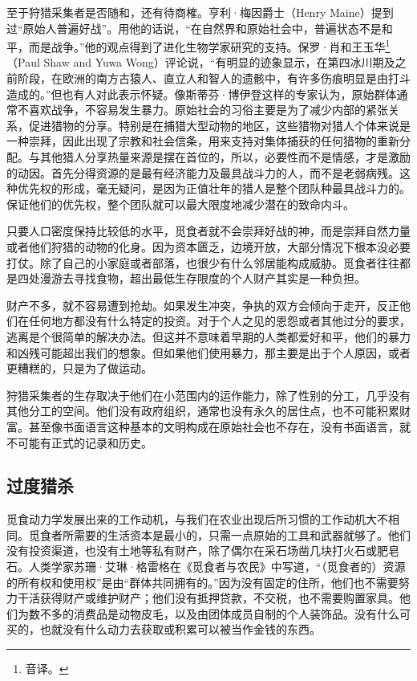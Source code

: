 至于狩猎采集者是否随和，还有待商榷。亨利·梅因爵士（Henry Maine）提到过“原始人普遍好战”。用他的话说，“在自然界和原始社会中，普遍状态不是和平，而是战争。”他的观点得到了进化生物学家研究的支持。保罗·肖和王玉华\footnote{音译。}（Paul Shaw and Yuwa Wong）评论说，“有明显的迹象显示，在第四冰川期及之前阶段，在欧洲的南方古猿人、直立人和智人的遗骸中，有许多伤痕明显是由打斗造成的。”但也有人对此表示怀疑。像斯蒂芬·博伊登这样的专家认为，原始群体通常不喜欢战争，不容易发生暴力。原始社会的习俗主要是为了减少内部的紧张关系，促进猎物的分享。特别是在捕猎大型动物的地区，这些猎物对猎人个体来说是一种崇拜，因此出现了宗教和社会信条，用来支持对集体捕获的任何猎物的重新分配。与其他猎人分享热量来源是摆在首位的，所以，必要性而不是情感，才是激励的动因。首先分得资源的是最有经济能力及最具战斗力的人，而不是老弱病残。这种优先权的形成，毫无疑问，是因为正值壮年的猎人是整个团队种最具战斗力的。保证他们的优先权，整个团队就可以最大限度地减少潜在的致命内斗。

只要人口密度保持比较低的水平，觅食者就不会崇拜好战的神，而是崇拜自然力量或者他们狩猎的动物的化身。因为资本匮乏，边境开放，大部分情况下根本没必要打仗。除了自己的小家庭或者部落，也很少有什么邻居能构成威胁。觅食者往往都是四处漫游去寻找食物，超出最低生存限度的个人财产其实是一种负担。

财产不多，就不容易遭到抢劫。如果发生冲突，争执的双方会倾向于走开，反正他们在任何地方都没有什么特定的投资。对于个人之见的恩怨或者其他过分的要求，逃离是个很简单的解决办法。但这并不意味着早期的人类都爱好和平，他们的暴力和凶残可能超出我们的想象。但如果他们使用暴力，那主要是出于个人原因，或者更糟糕的，只是为了做运动。

狩猎采集者的生存取决于他们在小范围内的运作能力，除了性别的分工，几乎没有其他分工的空间。他们没有政府组织，通常也没有永久的居住点，也不可能积累财富。甚至像书面语言这种基本的文明构成在原始社会也不存在，没有书面语言，就不可能有正式的记录和历史。

\subsection{过度猎杀}
觅食动力学发展出来的工作动机，与我们在农业出现后所习惯的工作动机大不相同。觅食者所需要的生活资本是最小的，只需一点原始的工具和武器就够了。他们没有投资渠道，也没有土地等私有财产，除了偶尔在采石场凿几块打火石或肥皂石。人类学家苏珊·艾琳·格雷格在《觅食者与农民》中写道，“（觅食者的）资源的所有权和使用权”是由“群体共同拥有的。”因为没有固定的住所，他们也不需要努力干活获得财产或维护财产；他们没有抵押贷款，不交税，也不需要购置家具。他们为数不多的消费品是动物皮毛，以及由团体成员自制的个人装饰品。没有什么可买的，也就没有什么动力去获取或积累可以被当作金钱的东西。

